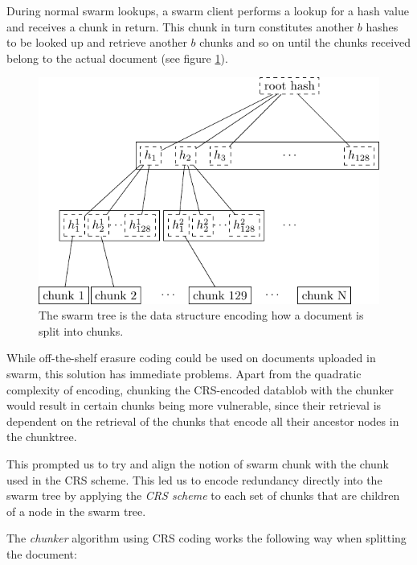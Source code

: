 During normal swarm lookups, a swarm client performs a lookup for a hash value and receives a chunk in return. This chunk in turn constitutes another $b$ hashes to be looked up and retrieve another $b$ chunks and so on until the chunks received belong to the actual document (see figure \ref{fig:tree2}).


\begin{figure}[htbp]
   \centering
   \includegraphics{fig/tree2.pdf} %
   \caption{ The swarm tree is the data structure encoding how a document is split into chunks.}
   \label{fig:tree2}
\end{figure}

While off-the-shelf erasure coding could be used on documents uploaded in swarm, this solution has immediate problems. Apart from the quadratic complexity of encoding, chunking the CRS-encoded datablob with the chunker would result in certain chunks being more vulnerable, since their retrieval is dependent on the retrieval of the chunks that encode all their ancestor nodes in the chunktree.

This prompted us to try and align the notion of swarm chunk with the chunk used in the CRS scheme. This led us to encode redundancy directly into the swarm tree by applying the \emph{CRS scheme}  to each set of chunks that are children of a node in the swarm tree.

The \emph{chunker} algorithm using CRS coding works the following way when splitting the document:

